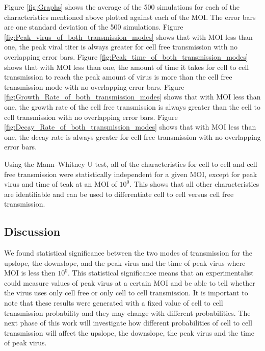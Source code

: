 \documentclass[a4paper]{article}
\begin{document}
Figure \ref{fig:Graphs} shows the average of the 500 simulations for each of the characteristics mentioned above plotted against each of the MOI. The error bars are one standard deviation of the 500 simulations. Figure \ref{fig:Peak_virus_of_both_transmission_modes} shows that with MOI less than one, the peak viral titer is always greater for cell free transmission with no overlapping error bars. Figure \ref{fig:Peak_time_of_both_transmission_modes} shows that with MOI less than one, the amount of time it takes for cell to cell transmission to reach the peak amount of virus is more than the cell free transmission mode with no overlapping error bars. Figure \ref{fig:Growth_Rate_of_both_transmission_modes} shows that with MOI less than one, the growth rate of the cell free transmission is always greater than the cell to cell transmission with no overlapping error bars. Figure \ref{fig:Decay_Rate_of_both_transmission_modes} shows that with MOI less than one, the decay rate is always greater for cell free transmission with no overlapping error bars. 

Using the Mann–Whitney U test, all of the characteristics for cell to cell and cell free transmission were statistically independent for a given MOI, except for peak virus and time of teak at an MOI of $10^0$. This shows that all other characteristics are identifiable and can be used to differentiate cell to cell versus cell free transmission.


%

\subsection{Discussion}
We found statistical significance between the two modes of transmission for the upslope, the downslope, and the peak virus and the time of peak virus where MOI is less then $10^0$. This statistical significance means that an experimentalist could measure values of peak virus at a certain MOI and be able to tell whether the virus uses only cell free or only cell to cell transmission. It is important to note that these results were generated with a fixed value of cell to cell transmission probability and they may change with different probabilities. The next phase of this work will investigate how different probabilities of cell to cell transmission  will affect the upslope, the downslope, the peak virus and the time of peak virus.
\end{document}
